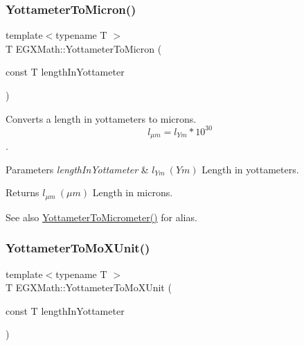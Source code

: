 \subsubsection{\texorpdfstring{Yottameter\+To\+Micron()}{YottameterToMicron()}}
{\footnotesize\ttfamily template$<$typename T $>$ \\
T E\+G\+X\+Math\+::\+Yottameter\+To\+Micron (\begin{DoxyParamCaption}\item[{const T}]{length\+In\+Yottameter }\end{DoxyParamCaption})}



Converts a length in yottameters to microns. \[ l_{\mu m}=l_{Ym} * 10^{30} \]. 


\begin{DoxyParams}{Parameters}
{\em length\+In\+Yottameter} & $ l_{Ym}\ (Ym)$ Length in yottameters. \\
\hline
\end{DoxyParams}
\begin{DoxyReturn}{Returns}
$ l_{\mu m}\ (\mu m)$ Length in microns. 
\end{DoxyReturn}
\begin{DoxySeeAlso}{See also}
\mbox{\hyperlink{group___e_g_x_math-_conversions-_length_conversions-_yottameter-_s_i_ga25310d8ba2830f305680927ac3c13c38}{Yottameter\+To\+Micrometer()}} for alias. 
\end{DoxySeeAlso}
\mbox{\label{group___e_g_x_math-_conversions-_length_conversions-_yottameter-_non-_s_i_ga545da9526f7a62f5ca7d1800faf17d1d}} 
\subsubsection{\texorpdfstring{Yottameter\+To\+Mo\+X\+Unit()}{YottameterToMoXUnit()}}
{\footnotesize\ttfamily template$<$typename T $>$ \\
T E\+G\+X\+Math\+::\+Yottameter\+To\+Mo\+X\+Unit (\begin{DoxyParamCaption}\item[{const T}]{length\+In\+Yottameter }\end{DoxyParamCaption})}



